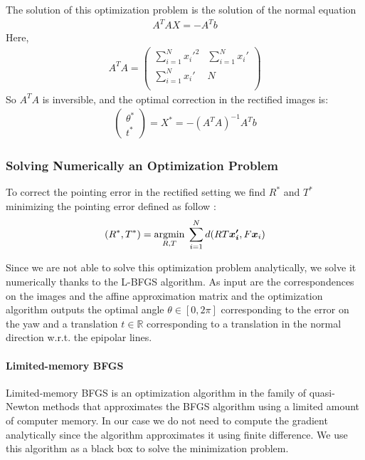 \documentclass[paper=a4, fontsize=11pt, onecolumn, tikz, dvipsnames, svgnames, x11names]{article}
\begin{document}
The solution of this optimization problem is the solution of the normal equation
\begin{align*}
 A^TAX = -A^Tb
\end{align*}
Here, 
\begin{align*}
A^TA = 
\begin{pmatrix}
\sum\limits_{i=1}^N x_{i}'^2 & \sum\limits_{i=1}^Nx_{i}' \\
\sum\limits_{i=1}^N x_{i}' & N \\
\end{pmatrix}
\end{align*}
So $A^TA$ is inversible, and the optimal correction in the rectified images is:
\begin{align*}
\begin{pmatrix}
\theta^* \\
t^*
\end{pmatrix} = X^* = -(A^TA)^{-1}A^Tb
\end{align*}


\subsubsection{Solving Numerically an Optimization Problem}
To correct the pointing error in the rectified setting we find $R^*$ and $T^*$ minimizing the pointing error defined as follow :
\begin{align}
    (R^*, T^*) = \underset{R,T}{\operatorname{argmin}}\; \sum_{i=1}^N d(RT\bm{x_i'}, F\bm{x}_i)
\end{align}

Since we are not able to solve this optimization problem analytically, we solve it numerically thanks to the L-BFGS algorithm. As input are the correspondences on the images and the affine approximation matrix and the optimization algorithm outputs the optimal angle $\theta \in [0, 2\pi]$ corresponding to the error on the yaw and a translation $t \in \mathbb{R}$ corresponding to a translation in the normal direction w.r.t. the epipolar lines. 

\paragraph{Limited-memory BFGS\\}
Limited-memory BFGS is an optimization algorithm in the family of quasi-Newton methods that approximates the BFGS algorithm using a limited amount of computer memory. In our case we do not need to compute the gradient analytically since the algorithm approximates it using finite difference. We use this algorithm as a black box to solve the minimization problem.
\end{document}
